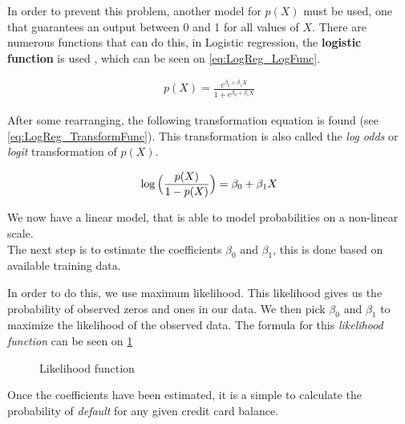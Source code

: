 In order to prevent this problem, another model for $p(X)$ must be used, one that guarantees an output between 0 and 1 for all values of $X$. There are numerous functions that can do this, in Logistic regression, the \textbf{logistic function} is used , which can be seen on \cref{eq:LogReg_LogFunc}.

\begin{equation} \label{eq:LogReg_LogFunc}
\begin{split}
p(X)=\frac{e^{\beta_0 + \beta_1 X}}{1+e^{\beta_0 + \beta_1 X}}
\end{split}
\end{equation}

After some rearranging, the following transformation equation is found (see \cref{eq:LogReg_TransformFunc}). This transformation is also called the \textit{log odds} or \textit{logit} transformation of $p(X)$.

\begin{equation} \label{eq:LogReg_TransformFunc}
\begin{split}
\log{\Bigl(\frac{p(X)}{1-p(X)}\Bigr)}= \beta_0+ \beta_1 X
\end{split}
\end{equation}

We now have a linear model, that is able to model probabilities on a non-linear scale.\\
The next step is to estimate the coefficients $\beta_0$ and $\beta_1$, this is done based on available training data.

In order to do this, we use maximum likelihood. This likelihood gives us the probability of observed zeros and ones in our data. We then pick $\beta_0$ and $\beta_1$ to maximize the likelihood of the observed data. The formula for this \textit{likelihood function} can be seen on \cref{fig:maximum_likelihood}

\begin{figure}[H]
	\centering
	\caption{Likelihood function}
	\label{fig:maximum_likelihood}
\end{figure}

Once the coefficients have been estimated, it is a simple to calculate the probability of \textit{default} for any given credit card balance.

